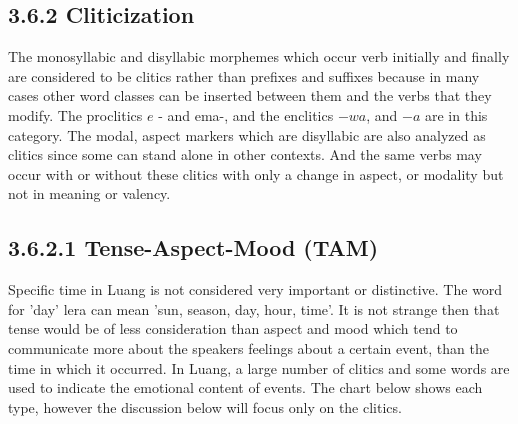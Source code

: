 \documentclass[10pt]{article}
\begin{document}
\subsection*{3.6.2 Cliticization}
The monosyllabic and disyllabic morphemes which occur verb initially and finally are considered to be clitics rather than prefixes and suffixes because in many cases other word classes can be inserted between them and the verbs that they modify. The proclitics \(e\) - and ema-, and the enclitics \(-w a\), and \(-a\) are in this category. The modal, aspect markers which are disyllabic are also analyzed as clitics since some can stand alone in other contexts. And the same verbs may occur with or without these clitics with only a change in aspect, or modality but not in meaning or valency.

\subsection*{3.6.2.1 Tense-Aspect-Mood (TAM)}
Specific time in Luang is not considered very important or distinctive. The word for 'day' lera can mean 'sun, season, day, hour, time'. It is not strange then that tense would be of less consideration than aspect and mood which tend to communicate more about the speakers feelings about a certain event, than the time in which it occurred. In Luang, a large number of clitics and some words are used to indicate the emotional content of events. The chart below shows each type, however the discussion below will focus only on the clitics.
\end{document}
